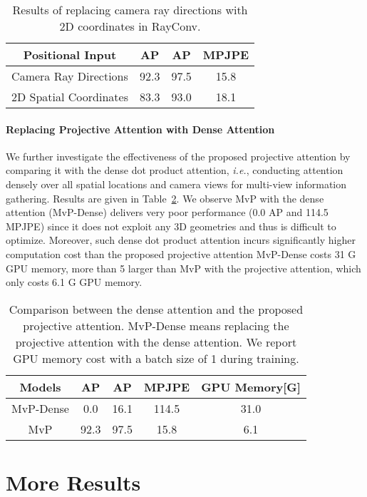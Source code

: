 \documentclass{article}
\newcommand{\ie}{\emph{i.e.}}
\begin{document}
\begin{table}[h]
    \centering
     \caption{Results of replacing camera ray directions with 2D coordinates in RayConv.}
	\begin{tabular}{cccc}
		\toprule
		Positional Input & AP & AP & MPJPE \\
		\midrule
		Camera Ray Directions  & 92.3 & 97.5 & 15.8 \\
		2D Spatial Coordinates  & 83.3 & 93.0 & 18.1 \\
		\bottomrule
	\end{tabular}
    \label{supp:exp:2dcoords}
\end{table}

\paragraph{Replacing Projective Attention with Dense Attention}
We further investigate the effectiveness of the proposed projective attention by  comparing it with  
the dense dot product attention, \ie, conducting attention densely over all spatial locations and camera views for multi-view information gathering.
Results are given in Table~\ref{supp:exp:vanilla_attn}. 
We observe MvP with the dense attention (MvP-Dense) delivers very poor performance (0.0 AP and 114.5 MPJPE)
since it does not exploit any 3D geometries and thus is difficult to optimize.
Moreover, such dense dot product attention incurs significantly higher computation cost than the proposed projective attention\textemdash
MvP-Dense costs 31 G GPU memory, more than 5 larger than MvP with the projective attention, which only costs 6.1 G GPU memory.

\begin{table}[h]
    \centering
    \caption{
    Comparison between   the dense attention and the proposed projective attention. MvP-Dense means replacing the projective attention with the dense attention. We report GPU memory cost with a batch size of 1 during training.}
	\begin{tabular}{ccccc}
		\toprule
		Models & AP & AP & MPJPE & GPU Memory[G]\\
		\midrule
		MvP-Dense  & 0.0 & 16.1 & 114.5 & 31.0 \\
MvP  & 92.3 & 97.5 & 15.8 & 6.1\\
		\bottomrule
	\end{tabular}
    \label{supp:exp:vanilla_attn}
\end{table}

\section*{More Results}
\end{document}
